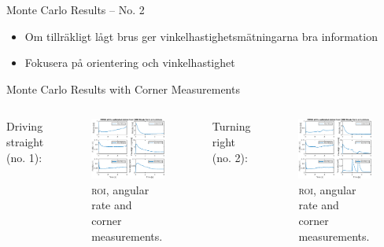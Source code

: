 \documentclass{beamer}
\newcommand{\roi}{\textsc{roi}\xspace}
\renewcommand{\a}{\r{a}\xspace}
\renewcommand{\aa}{\"a\xspace}
\begin{document}
\begin{frame}{Monte Carlo Results -- No. 2}
	\note
	{
		\begin{itemize}
			\item Om tillr\aa{}kligt l\a{}gt brus ger vinkelhastighetsm\aa{}tningarna bra information
			\item Fokusera p\a{} orientering och vinkelhastighet
		\end{itemize}
	}
\end{frame}

\begin{frame}{Monte Carlo Results with Corner Measurements}
	\begin{columns}[T]
	Driving straight (no. 1):
	\begin{figure}
		\includegraphics[width=\textwidth]{MC/30_MC_1000_Rmse}
		\caption{\roi, angular rate and corner measurements.}
	\end{figure}
	Turning right (no. 2):
	\begin{figure}
		\includegraphics[width=\textwidth]{MC/29_MC_1000_Rmse}
		\caption{\roi, angular rate and corner measurements.}
	\end{figure}
	\end{columns}


\end{frame}
\end{document}
